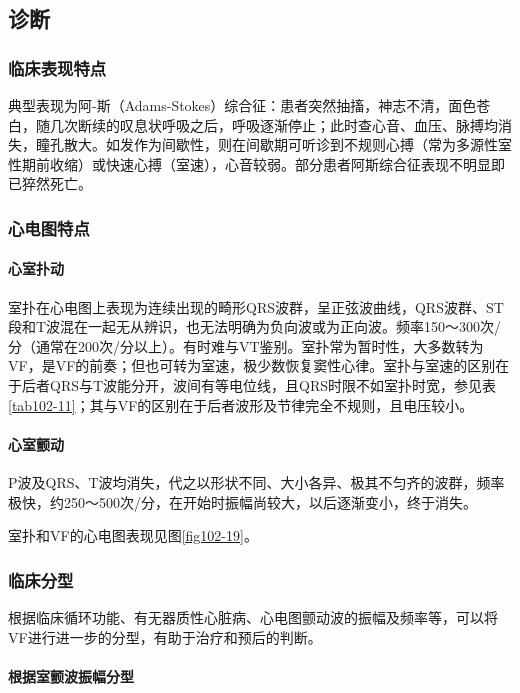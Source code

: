 \subsection{诊断}

\subsubsection{临床表现特点}

典型表现为阿-斯（Adams-Stokes）综合征：患者突然抽搐，神志不清，面色苍白，随几次断续的叹息状呼吸之后，呼吸逐渐停止；此时查心音、血压、脉搏均消失，瞳孔散大。如发作为间歇性，则在间歇期可听诊到不规则心搏（常为多源性室性期前收缩）或快速心搏（室速），心音较弱。部分患者阿斯综合征表现不明显即已猝然死亡。

\subsubsection{心电图特点}

\paragraph{心室扑动}

室扑在心电图上表现为连续出现的畸形QRS波群，呈正弦波曲线，QRS波群、ST段和T波混在一起无从辨识，也无法明确为负向波或为正向波。频率150～300次/分（通常在200次/分以上）。有时难与VT鉴别。室扑常为暂时性，大多数转为VF，是VF的前奏；但也可转为室速，极少数恢复窦性心律。室扑与室速的区别在于后者QRS与T波能分开，波间有等电位线，且QRS时限不如室扑时宽，参见表\ref{tab102-11}；其与VF的区别在于后者波形及节律完全不规则，且电压较小。

\paragraph{心室颤动}

P波及QRS、T波均消失，代之以形状不同、大小各异、极其不匀齐的波群，频率极快，约250～500次/分，在开始时振幅尚较大，以后逐渐变小，终于消失。

室扑和VF的心电图表现见图\ref{fig102-19}。

\subsubsection{临床分型}

根据临床循环功能、有无器质性心脏病、心电图颤动波的振幅及频率等，可以将VF进行进一步的分型，有助于治疗和预后的判断。

\paragraph{根据室颤波振幅分型}

